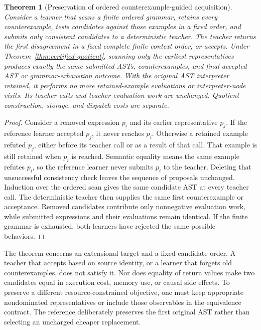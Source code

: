 \documentclass[11pt,letterpaper]{article}
\theoremstyle{plain}
\newtheorem{theorem}{Theorem}[section]
\theoremstyle{definition}
\begin{document}
\begin{theorem}[Preservation of ordered counterexample-guided acquisition]\label{thm:cegis-quotient}
Consider a learner that scans a finite ordered grammar, retains every counterexample, tests candidates against those examples in a fixed order, and submits only consistent candidates to a deterministic teacher. The teacher returns the first disagreement in a fixed complete finite context order, or accepts. Under Theorem~\ref{thm:certified-quotient}, scanning only the earliest representatives produces exactly the same submitted ASTs, counterexamples, and final accepted AST or grammar-exhaustion outcome. With the original AST interpreter retained, it performs no more retained-example evaluations or interpreter-node visits. Its teacher calls and teacher-evaluation work are unchanged. Quotient construction, storage, and dispatch costs are separate.
\end{theorem}
\begin{proof}
Consider a removed expression $p_i$ and its earlier representative $p_j$. If the reference learner accepted $p_j$, it never reaches $p_i$. Otherwise a retained example refuted $p_j$, either before its teacher call or as a result of that call. That example is still retained when $p_i$ is reached. Semantic equality means the same example refutes $p_i$, so the reference learner never submits $p_i$ to the teacher. Deleting that unsuccessful consistency check leaves the sequence of proposals unchanged. Induction over the ordered scan gives the same candidate AST at every teacher call. The deterministic teacher then supplies the same first counterexample or acceptance. Removed candidates contribute only nonnegative evaluation work, while submitted expressions and their evaluations remain identical. If the finite grammar is exhausted, both learners have rejected the same possible behaviors.
\end{proof}

The theorem concerns an extensional target and a fixed candidate order. A teacher that accepts based on source identity, or a learner that forgets old counterexamples, does not satisfy it. Nor does equality of return values make two candidates equal in execution cost, memory use, or causal side effects. To preserve a different resource-constrained objective, one must keep appropriate nondominated representatives or include those observables in the equivalence contract. The reference deliberately preserves the first original AST rather than selecting an uncharged cheaper replacement.
\end{document}

